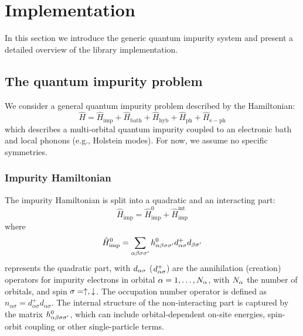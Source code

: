\documentclass[edipack2.tex]{subfiles}
\begin{document}
\section{Implementation}\label{SecEDIpack}
In this section we introduce the generic quantum impurity system and
present a detailed overview of the \NAME library implementation. 













\subsection{The quantum impurity problem}\label{sSecQIM}
We consider a general quantum impurity problem described by the Hamiltonian:
$$
\hat{H} = \hat{H}_\mathrm{imp} + \hat{H}_\mathrm{bath} + \hat{H}_\mathrm{hyb} + \hat{H}_\mathrm{ph} + \hat{H}_\mathrm{e-ph}
$$
which describes a multi-orbital quantum impurity
coupled to an electronic bath and local phonons (e.g., Holstein
modes). For now, we assume no specific symmetries.

\subsubsection{Impurity Hamiltonian}
The impurity Hamiltonian is split into a quadratic and an 
interacting part:
\begin{equation}\label{Himp}
  \hat{H}_\mathrm{imp}  = \hat{H}^0_\mathrm{imp} + \hat{H}^\mathrm{int}_\mathrm{imp}
\end{equation}
where
\begin{equation}\label{H0imp}
  \hat{H}^0_\mathrm{imp}  =
  \sum_{\alpha\beta\sigma\sigma'}h^{0}_{\alpha\beta\sigma\sigma'}d^{+}_{\alpha\sigma}d_{\beta\sigma'}\\
\end{equation}
represents the quadratic part, with $d_{\alpha\sigma}$ ($d^+_{\alpha\sigma}$) are the annihilation (creation)
operators for impurity electrons in 
orbital $\alpha=1,\dots,N_\alpha$, with $N_\alpha$ the number of orbitals,
and spin $\sigma=\uparrow,\downarrow$.  The occupation number operator is defined
as  $n_{\alpha\sigma}=d^{+}_{\alpha\sigma}d_{\alpha\sigma}$.
The internal structure of the non-interacting part is captured by the 
matrix $h^{0}_{\alpha\beta\sigma\sigma'}$, which can include 
orbital-dependent on-site energies, spin-orbit coupling or other 
single-particle terms.
\end{document}

